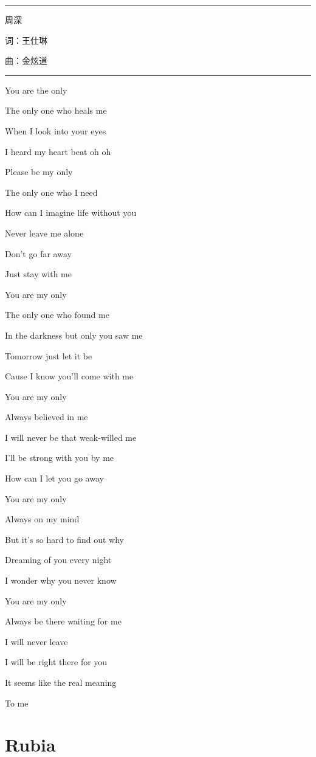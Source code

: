 \documentclass[]{ctexbook}
\begin{document}
\begin{center}\rule{0.5\linewidth}{0.5pt}\end{center}

周深

词：王仕琳

曲：金炫道

\begin{center}\rule{0.5\linewidth}{0.5pt}\end{center}

You are the only

The only one who heals me

When I look into your eyes

I heard my heart beat oh oh

Please be my only

The only one who I need

How can I imagine life without you

Never leave me alone

Don't go far away

Just stay with me

You are my only

The only one who found me

In the darkness but only you saw me

Tomorrow just let it be

Cause I know you'll come with me

You are my only

Always believed in me

I will never be that weak-willed me

I'll be strong with you by me

How can I let you go away

You are my only

Always on my mind

But it's so hard to find out why

Dreaming of you every night

I wonder why you never know

You are my only

Always be there waiting for me

I will never leave

I will be right there for you

It seems like the real meaning

To me

\section*{Rubia}\label{rubia}
\end{document}
